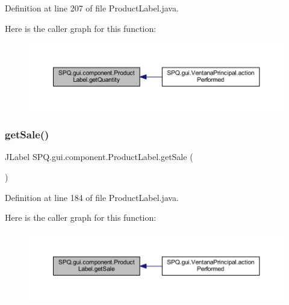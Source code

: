 Definition at line 207 of file Product\+Label.\+java.

Here is the caller graph for this function\+:
\nopagebreak
\begin{figure}[H]
\begin{center}
\leavevmode
\includegraphics[width=350pt]{class_s_p_q_1_1gui_1_1component_1_1_product_label_adcfdea4cb072291bea24728bf75aac10_icgraph}
\end{center}
\end{figure}
\mbox{\label{class_s_p_q_1_1gui_1_1component_1_1_product_label_a7841fcd56578df74918d99fa2b705e24}} 
\subsubsection{\texorpdfstring{get\+Sale()}{getSale()}}
{\footnotesize\ttfamily J\+Label S\+P\+Q.\+gui.\+component.\+Product\+Label.\+get\+Sale (\begin{DoxyParamCaption}{ }\end{DoxyParamCaption})}



Definition at line 184 of file Product\+Label.\+java.

Here is the caller graph for this function\+:
\nopagebreak
\begin{figure}[H]
\begin{center}
\leavevmode
\includegraphics[width=350pt]{class_s_p_q_1_1gui_1_1component_1_1_product_label_a7841fcd56578df74918d99fa2b705e24_icgraph}
\end{center}
\end{figure}
\mbox{\label{class_s_p_q_1_1gui_1_1component_1_1_product_label_ac3981c38ea018be3253d133cd1da8b83}} 
